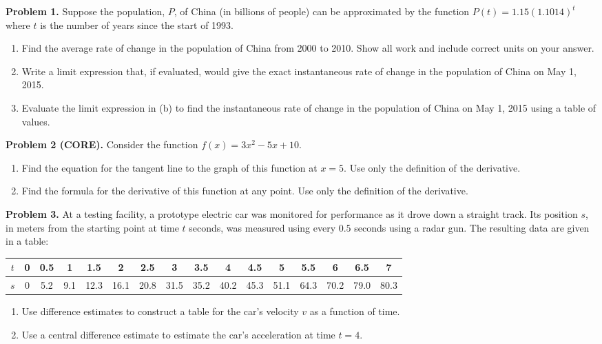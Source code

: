 \documentclass[addpoints]{exam}
\begin{document}
\noindent
\textbf{Problem 1.} Suppose the population, $P$, of China (in billions of people) can be approximated by the function $P(t) = 1.15(1.1014)^t$ where $t$ is the number of years since the start of 1993. 
	\begin{enumerate}
		\item Find the average rate of change in the population of China from 2000 to 2010. Show all work and include correct units on your answer. 
		\item Write a limit expression that, if evaluated, would give the exact instantaneous rate of change in the population of China on May 1, 2015. 
		\item Evaluate the limit expression in (b) to find the instantaneous rate of change in the population of China on May 1, 2015 using a table of values.  
	\end{enumerate}
\vspace{0.3in}

\noindent
\textbf{Problem 2 (CORE).} Consider the function $f(x) = 3x^2 - 5x + 10$. 
	\begin{enumerate}
		\item Find the equation for the tangent line to the graph of this function at $x = 5$. Use only the definition of the derivative. 
		\item Find the formula for the derivative of this function at any point. Use only the definition of the derivative. 
	\end{enumerate}

\vspace{0.3in}

\noindent
\textbf{Problem 3.} At a testing facility, a prototype electric car was monitored for performance as it drove down a straight track. Its position $s$, in meters from the starting point at time $t$ seconds, was measured using every $0.5$ seconds using a radar gun. The resulting data are given in a table: 
\begin{center}
		\begin{tabular}{c||ccccccccccccccc}
		$t$ & 0 & 0.5  & 1 & 1.5 & 2 & 2.5 & 3 & 3.5 & 4 & 4.5 & 5 & 5.5 & 6 & 6.5 & 7 \\ \hline
		$s$ & 0 & 5.2 & 9.1 & 12.3 & 16.1 & 20.8 & 31.5 & 35.2 & 40.2  & 45.3 & 51.1 & 64.3 & 70.2 & 79.0 & 80.3
		\end{tabular}
\end{center}
\begin{enumerate}
	\item Use difference estimates to construct a table for the car's velocity $v$ as a function of time. 
	\item Use a central difference estimate to estimate the car's acceleration at time $t = 4$. 
\end{enumerate}
\end{document}
